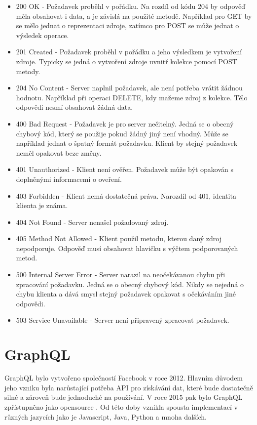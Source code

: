 \documentclass[thesis=M,czech]{FITthesis}[2019/12/23]
\begin{document}
\begin{itemize}
    \item 200 OK - Požadavek proběhl v pořádku. Na rozdíl od kódu 204 by odpověď měla obsahovat i data, a je závislá na použité metodě. Například pro GET by se mělo jednat o reprezentaci zdroje, zatímco pro POST se může jednat o výsledek operace. %
    \item 201 Created - Požadavek proběhl v pořádku a jeho výsledkem je vytvoření zdroje. Typicky se jedná o vytvoření zdroje uvnitř kolekce pomocí POST metody.
    \item 204 No Content - Server naplnil požadavek, ale není potřeba vrátit žádnou hodnotu. Například při operaci DELETE, kdy mažeme zdroj z kolekce. Tělo odpovědi nesmí obsahovat žádná data.
    \item 400 Bad Request - Požadavek je pro server nečitelný. Jedná se o obecný chybový kód, který se použije pokud žádný jiný není vhodný. Může se například jednat o špatný formát požadavku. Klient by stejný požadavek neměl opakovat beze změny.
    \item 401 Unauthorized - Klient není ověřen. Požadavek může být opakován s doplněnými informacemi o oveření.
    \item 403 Forbidden - Klient nemá dostatečná práva. Narozdíl od 401, identita klienta je známa.
    \item 404 Not Found - Server nenašel požadovaný zdroj.
    \item 405 Method Not Allowed - Klient použil metodu, kterou daný zdroj nepodporuje. Odpověď musí obsahovat hlavičku s výčtem podporovaných metod.
    \item 500 Internal Server Error - Server narazil na neočekávanou chybu při zpracování požadavku. Jedná se o obecný chybový kód. Nikdy se nejedná o chybu klienta a dává smysl stejný požadavek opakovat s očekáváním jiné odpovědi.
    \item 503 Service Unavailable - Server není připravený zpracovat požadavek.
\end{itemize}

\section{GraphQL}
GraphQL bylo vytvořeno společností Facebook v roce 2012. Hlavním důvodem jeho vzniku byla narůstající potřeba API pro získávání dat, které bude dostatečně silné a zároveň bude jednoduché na používání. V roce 2015 pak bylo GraphQL zpřístupněno jako opensource \cite{graphql_fb}. Od této doby vznikla spousta implementací v různých jazycích jako je Javascript, Java, Python a mnoha dalších.
\end{document}
